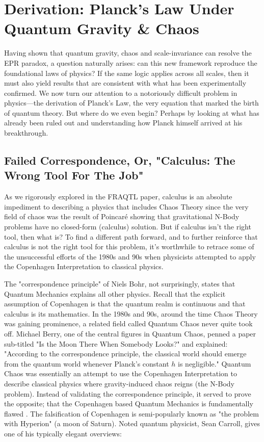 \documentclass{report}
\begin{document}
\section*{Derivation: Planck's Law Under Quantum Gravity \& Chaos}
Having shown that quantum gravity, chaos and scale-invariance can resolve the EPR paradox, a question naturally arises: can this new framework reproduce the foundational laws of physics? If the same logic applies across all scales, then it must also yield results that are consistent with what has been experimentally confirmed. We now turn our attention to a notoriously difficult problem in physics—the derivation of Planck's Law, the very equation that marked the birth of quantum theory. But where do we even begin? Perhaps by looking at what has already been ruled out and understanding how Planck himself arrived at his breakthrough.

\subsection*{Failed Correspondence, Or, "Calculus: The Wrong Tool For The Job"}
As we rigorously explored in the FRAQTL paper, calculus is an absolute impediment to describing a physics that includes Chaos Theory\cite{FRAQTL2024} since the very field of chaos was the result of Poincar\'e showing that gravitational N-Body problems have no closed-form (calculus) solution. But if calculus isn't the right tool, then what is? To find a different path forward, and to further reinforce that calculus is not the right tool for this problem, it's worthwhile to retrace some of the unsuccessful efforts of the 1980s and 90s when physicists attempted to apply the Copenhagen Interpretation to classical physics.

The "correspondence principle" of Niels Bohr, not surprisingly, states that Quantum Mechanics explains all other physics. Recall that the explicit assumption of Copenhagen is that the quantum realm is continuous and that calculus is its mathematics. In the 1980s and 90s, around the time Chaos Theory was gaining prominence, a related field called Quantum Chaos never quite took off. Michael Berry, one of the central figures in Quantum Chaos, penned a paper sub-titled "Is the Moon There When Somebody Looks?" and explained: "According to the correspondence principle, the classical world should emerge from the quantum world whenever Planck’s constant $h$ is negligible." Quantum Chaos was essentially an attempt to use the Copenhagen Interpretation to describe classical physics where gravity-induced chaos reigns (the N-Body problem). Instead of validating the correspondence principle, it served to prove the opposite; that the Copenhagen based Quantum Mechanics is fundamentally flawed \cite{Zurek1998}. The falsification of Copenhagen is semi-popularly known as "the problem with Hyperion" (a moon of Saturn). Noted quantum physicist, Sean Carroll, gives one of his typically elegant overviews:
\end{document}
